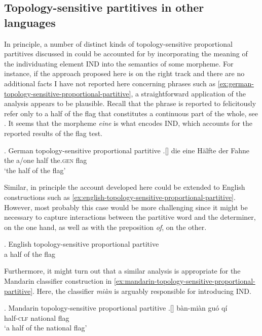 	\subsection{Topology-sensitive partitives in other languages}\label{sec:topology-sensitive-partitives-in-other-languages}
	
	In principle, a number of distinct kinds of topology-sensitive proportional partitives discussed in   could be accounted for by incorporating the meaning of the individuating element IND into the semantics of some morpheme. For instance, if the approach proposed here is on the right track and there are no additional facts I have not reported here concerning phrases such as \ref{ex:german-topology-sensitive-proportional-partitive}, a straightforward application of the analysis appears to be plausible. Recall that the phrase is reported to felicitously refer only to a half of the flag that constitutes a continuous part of the whole, see . It seems that the morpheme \textit{eine} is what encodes IND, which accounts for the reported results of the flag test.
	
	\ex. German topology-sensitive proportional partitive\label{ex:german-topology-sensitive-proportional-partitive}
	\bg.[] die eine Hälfte der Fahne\\
	the a/one half the\textsc{.gen} flag\\
	`the half of the flag'
	
    Similar, in principle the account developed here could be extended to English constructions such as \ref{ex:english-topology-sensitive-proportional-partitive}. However, most probably this case would be more challenging since it might be necessary to capture interactions between the partitive word and the determiner, on the one hand, as well as with the preposition \textit{of}, on the other.
    
    \ex. English topology-sensitive proportional partitive\\
    a half of the flag\label{ex:english-topology-sensitive-proportional-partitive}
    
	Furthermore, it might turn out that a similar analysis is appropriate for the Mandarin classifier construction in \ref{ex:mandarin-topology-sensitive-proportional-partitive}. Here, the classifier \textit{mi{\`{a}}n} is arguably responsible for introducing IND.\pagebreak
	
	\ex. Mandarin topology-sensitive proportional partitive\label{ex:mandarin-topology-sensitive-proportional-partitive}
	\bg.[] b{\`{a}}n-mi{\`{a}}n gu{\'{o}} q{\'{i}}\\
	half-\textsc{clf} national flag\\
	`a half of the national flag'
	
